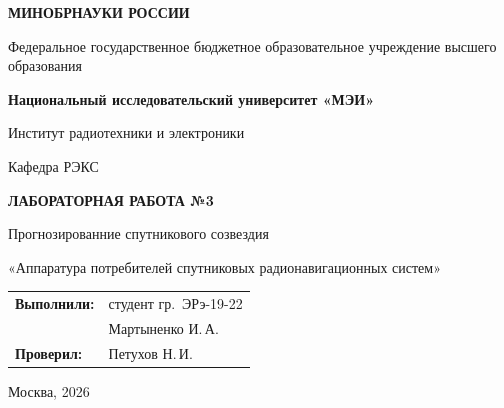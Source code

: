 \begin{titlepage}
    \centering
    {\bfseries МИНОБРНАУКИ РОССИИ\par}
    Федеральное государственное бюджетное образовательное учреждение высшего образования \\
    {\bfseries Национальный исследовательский университет «МЭИ»\par}
    \vspace{1cm}
    Институт радиотехники и электроники\par
    Кафедра РЭКС\par
    \vspace{3cm}
    
    {\bfseries\large ЛАБОРАТОРНАЯ РАБОТА №3\par}
    \vspace{0.5cm}
    
    {\large Прогнозированние спутникового созвездия\par}

    \vspace{0.5cm}
    {\large «Аппаратура потребителей спутниковых радионавигационных систем»\par}
    
    \vspace{3.5cm}
 \vspace{1.5cm}
\noindent\hfill
\begin{tabular}{@{}ll@{}}
    \textbf{Выполнили:} & студент гр.~ЭРэ-19-22 \\
                        & Мартыненко И.\,А. \\
    \textbf{Проверил:}  & Петухов Н.\,И.
\end{tabular}   
    \vfill
    {Москва, 2026}
\end{titlepage}
